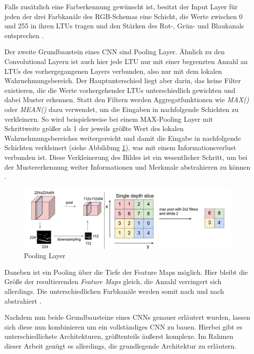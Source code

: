 Falls zusätzlich eine Farberkennung gewünscht ist, besitzt der Input Layer für jeden der drei Farbkanäle des RGB-Schemas eine Schicht, die Werte zwischen 0 und 255 in ihren LTUs tragen und den Stärken des Rot-, Grün- und Blaukanals entsprechen \cite{AurelienGeron.2018}.

Der zweite Grundbaustein eines CNN sind Pooling Layer. Ähnlich zu den Convolutional Layern ist auch hier jede LTU nur mit einer begrenzten Anzahl an LTUs des vorhergegangenen Layers verbunden, also nur mit dem lokalen Wahrnehmungsbereich. Der Hauptunterschied liegt aber darin, das keine Filter existieren, die die Werte vorhergehender LTUs unterschiedlich gewichten und dabei Muster erkennen. Statt den Filtern werden Aggregatfunktionen wie \textit{MAX()} oder \textit{MEAN()} dazu verwendet, um die Eingaben in nachfolgende Schichten zu verkleinern. So wird beispielsweise bei einem MAX-Pooling Layer mit Schrittweite größer als 1 der jeweils größte Wert des lokalen Wahrnehmungsbereiches weitergereicht und damit die  Eingabe in nachfolgende Schichten verkleinert (siehe Abbildung \ref{pooling_layer}), was mit einem Informationsverlust verbunden ist. Diese Verkleinerung des Bildes ist ein wesentlicher Schritt, um bei der Mustererkennung weiter Informationen und Merkmale abstrahieren zu können \cite{AurelienGeron.2018}.

\begin{figure}[H]
	\begin{center}
		\includegraphics[width=15cm]{Bilder/pooling_layer.png} 
		\caption[Pooling Layer]{Pooling Layer \cite{LeonadroAraujoSantos.2018}}
		\label{pooling_layer}
	\end{center}
\end{figure}

Daneben ist ein Pooling über die Tiefe der Feature Maps möglich. Hier bleibt die Größe der resultierenden \textit{Feature Maps} gleich, die Anzahl verringert sich allerdings. Die unterschiedlichen Farbkanäle werden somit nach und nach abstrahiert \cite{AurelienGeron.2018}.

Nachdem nun beide Grundbausteine eines CNNs genauer erläutert wurden, lassen sich diese nun kombinieren um ein vollständiges CNN zu bauen. Hierbei gibt es unterschiedlichste Architekturen, größtenteils äußerst komplexe. Im Rahmen dieser Arbeit genügt es allerdings, die grundlegende Architektur zu erläutern.

